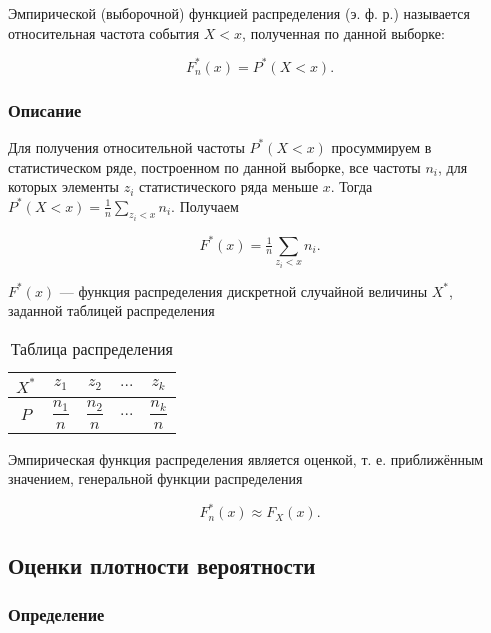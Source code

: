 Эмпирической (выборочной) функцией распределения (э. ф. р.) называется относительная частота события $X < x$, полученная по данной выборке:

\begin{equation}
	F_n^*(x) = P^*(X < x).
\end{equation}

\subsubsection{Описание}

Для получения относительной частоты $P^*(X < x)$ просуммируем в статистическом ряде, построенном по данной выборке, все частоты $n_i$, для которых элементы $z_i$ статистического ряда меньше $x$. Тогда $P^*(X < x) = \tfrac{1}{n}\sum\limits_{z_i < x}n_i$. Получаем

\begin{equation}
	F^*(x) = \tfrac{1}{n}\sum\limits_{z_i < x}n_i.
\end{equation}

$F^*(x)$ --- функция распределения дискретной случайной величины $X^*$, заданной таблицей распределения

\begin{table}[h!]
	\begin{center}
		\begin{tabular}{|c|c|c|c|c|}
			\hline
			$X^*$ & $z_1$ & $z_2$ & $...$ & $z_k$ \\
			\hline
			$P$ & $\dfrac{n_1}{n}$ & $\dfrac{n_2}{n}$ & $...$ & $\dfrac{n_k}{n}$ \\
			\hline
		\end{tabular}
	\end{center}
	\caption{Таблица распределения}
\end{table}

Эмпирическая функция распределения является оценкой, т. е. приближённым значением, генеральной функции распределения

\begin{equation}
	F_n^*(x) \approx F_X(x).
\end{equation}

\subsection{Оценки плотности вероятности}

\subsubsection{Определение}

